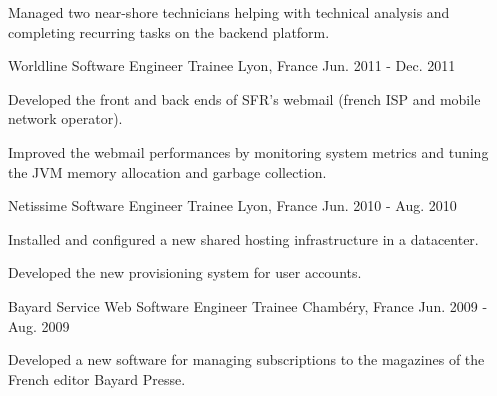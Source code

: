 \begin{cventries}
{\begin{cvitems}
        \item {Managed two near-shore technicians helping with technical analysis and completing recurring tasks on the backend platform.}
      \end{cvitems} 
    }
  \cventry
    {Worldline}
    {Software Engineer Trainee}
    {Lyon, France}
    {Jun. 2011 - Dec. 2011}
    {
      \begin{cvitems}
        \item {Developed the front and back ends of SFR's webmail (french ISP and mobile network operator).}
        \item {Improved the webmail performances by monitoring system metrics and tuning the JVM memory allocation and garbage collection.}
      \end{cvitems}
    }
    \cventry
    {Netissime}
    {Software Engineer Trainee}
    {Lyon, France}
    {Jun. 2010 - Aug. 2010}
    {
      \begin{cvitems}
        \item {Installed and configured a new shared hosting infrastructure in a datacenter.}
        \item {Developed the new provisioning system for user accounts.}
      \end{cvitems}
    }
    \cventry
    {Bayard Service Web}
    {Software Engineer Trainee}
    {Chambéry, France}
    {Jun. 2009 - Aug. 2009}
    {
      \begin{cvitems}
        \item {Developed a new software for managing subscriptions to the magazines of the French editor Bayard Presse.}
      \end{cvitems}
    }
\end{cventries}
